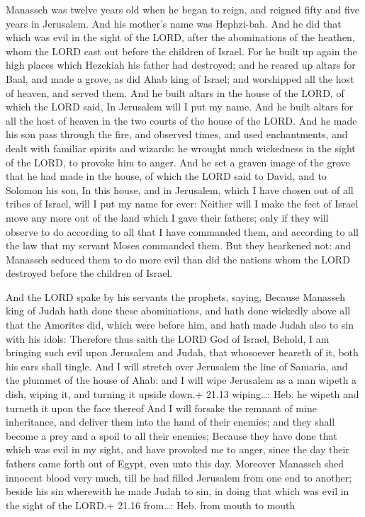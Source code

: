  Manasseh was twelve years old when he began to reign, and
reigned fifty and five years in Jerusalem. And his mother's name was
Hephzi-bah.  And he did that which was evil in the sight of
the LORD, after the abominations of the heathen, whom the LORD cast out
before the children of Israel.  For he built up again the
high places which Hezekiah his father had destroyed; and he reared up
altars for Baal, and made a grove, as did Ahab king of Israel; and
worshipped all the host of heaven, and served them.  And he
built altars in the house of the LORD, of which the LORD said, In
Jerusalem will I put my name.  And he built altars for all
the host of heaven in the two courts of the house of the LORD.
 And he made his son pass through the fire, and observed
times, and used enchantments, and dealt with familiar spirits and
wizards: he wrought much wickedness in the sight of the LORD, to provoke
him to anger.  And he set a graven image of the grove that
he had made in the house, of which the LORD said to David, and to
Solomon his son, In this house, and in Jerusalem, which I have chosen
out of all tribes of Israel, will I put my name for ever: 
Neither will I make the feet of Israel move any more out of the land
which I gave their fathers; only if they will observe to do according to
all that I have commanded them, and according to all the law that my
servant Moses commanded them.  But they hearkened not: and
Manasseh seduced them to do more evil than did the nations whom the LORD
destroyed before the children of Israel.

 And the LORD spake by his servants the prophets, saying,
 Because Manasseh king of Judah hath done these
abominations, and hath done wickedly above all that the Amorites did,
which were before him, and hath made Judah also to sin with his idols:
 Therefore thus saith the LORD God of Israel, Behold, I am
bringing such evil upon Jerusalem and Judah, that whosoever heareth of
it, both his ears shall tingle.  And I will stretch over
Jerusalem the line of Samaria, and the plummet of the house of Ahab: and
I will wipe Jerusalem as a man wipeth a dish, wiping it, and turning it
upside down.+ 21.13 wiping\ldots: Heb. he wipeth and turneth it upon the
face thereof  And I will forsake the remnant of mine
inheritance, and deliver them into the hand of their enemies; and they
shall become a prey and a spoil to all their enemies; 
Because they have done that which was evil in my sight, and have
provoked me to anger, since the day their fathers came forth out of
Egypt, even unto this day.  Moreover Manasseh shed innocent
blood very much, till he had filled Jerusalem from one end to another;
beside his sin wherewith he made Judah to sin, in doing that which was
evil in the sight of the LORD.+ 21.16 from\ldots: Heb. from mouth to
mouth

